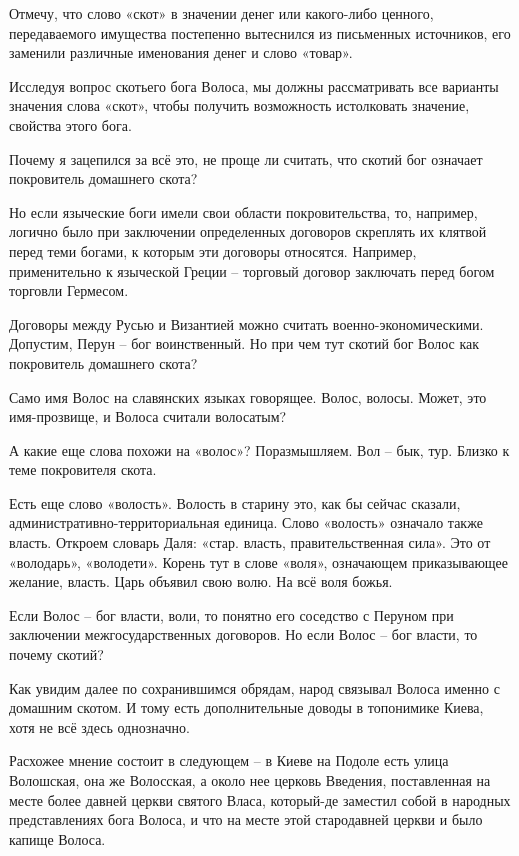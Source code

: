 \documentclass[a5paper,11pt,openany]{article}
\begin{document}
   Отмечу, что слово «скот» в значении денег или какого-либо ценного, передаваемого имущества постепенно вытеснился из письменных источников, его заменили различные именования денег и слово «товар».

   Исследуя вопрос скотьего бога Волоса, мы должны рассматривать все варианты значения слова «скот», чтобы получить возможность истолковать значение, свойства этого бога. 

   Почему я зацепился за всё это, не проще ли считать, что скотий бог означает покровитель домашнего скота?

Но если языческие боги имели свои области покровительства, то, например, логично было при заключении определенных договоров скреплять их клятвой перед теми богами, к которым эти договоры относятся. Например, применительно к языческой Греции – торговый договор заключать перед богом торговли Гермесом.

Договоры между Русью и Византией можно считать военно-экономическими. Допустим, Перун – бог воинственный. Но при чем тут скотий бог Волос как покровитель 
домашнего скота?

Само имя Волос на славянских языках говорящее. Волос, волосы. Может, это имя-прозвище, и Волоса считали волосатым?

А какие еще слова похожи на «волос»? Поразмышляем. Вол – бык, тур. Близко к теме покровителя скота.

Есть еще слово «волость». Волость в старину это, как бы сейчас сказали, административно-территор\-иальная единица. Слово «волость» означало также власть. Откроем словарь Даля: «стар. власть, правительственная сила». Это от «володарь», «володети». Корень тут в слове «воля», означающем приказывающее желание, власть. Царь объявил свою волю. На всё воля божья.

Если Волос – бог власти, воли, то понятно его соседство с Перуном при заключении межгосударственных договоров. Но если Волос – бог власти, то почему скотий?

Как увидим далее по сохранившимся обрядам, народ связывал Волоса именно с домашним скотом. И тому есть дополнительные доводы в топонимике Киева, хотя не всё здесь однозначно.

Расхожее мнение состоит в следующем – в Киеве на Подоле есть улица Волошская, она же Волосская, а около нее церковь Введения, поставленная на месте более давней церкви святого Власа, который-де заместил собой в народных представлениях бога Волоса, и что на месте этой стародавней церкви и было капище Волоса.
\end{document}
